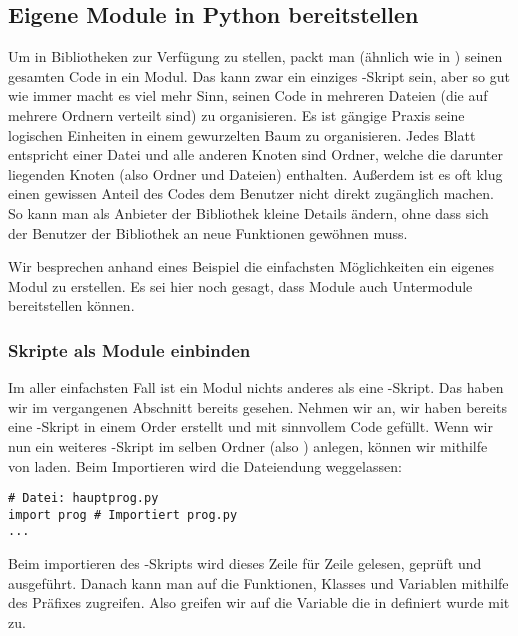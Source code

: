 \subsection{Eigene Module in Python bereitstellen}
\label{section:module:module_selbst_schreiben}
Um in \Python Bibliotheken zur Verfügung zu stellen, packt man (ähnlich wie in \CC) seinen gesamten Code in ein Modul.
Das kann zwar ein einziges \Python-Skript sein, aber so gut wie immer macht es viel mehr Sinn, seinen Code in mehreren Dateien (die auf mehrere Ordnern verteilt sind) zu organisieren.
Es ist gängige Praxis seine logischen Einheiten in einem gewurzelten Baum zu organisieren.
Jedes Blatt entspricht einer Datei und alle anderen Knoten sind Ordner, welche die darunter liegenden Knoten (also Ordner und Dateien) enthalten.
Außerdem ist es oft klug einen gewissen Anteil des Codes dem Benutzer nicht direkt zugänglich machen.
So kann man als Anbieter der Bibliothek kleine Details ändern, ohne dass sich der Benutzer der Bibliothek an neue Funktionen gewöhnen muss.

Wir besprechen anhand eines Beispiel die einfachsten Möglichkeiten ein eigenes Modul zu erstellen.
Es sei hier noch gesagt, dass Module auch Untermodule bereitstellen können.


\subsubsection{Skripte als Module einbinden}
Im aller einfachsten Fall ist ein Modul nichts anderes als eine \Python-Skript.
Das haben wir im vergangenen Abschnitt bereits gesehen.
Nehmen wir an, wir haben bereits eine \Python-Skript  in einem Order  erstellt und mit sinnvollem Code gefüllt.
Wenn wir nun ein weiteres \Python-Skript  im selben Ordner (also ) anlegen, können wir  mithilfe von  laden.
Beim Importieren wird die Dateiendung weggelassen:
\begin{lstlisting}
# Datei: hauptprog.py
import prog # Importiert prog.py
...
\end{lstlisting}
Beim importieren des \Python-Skripts  wird dieses Zeile für Zeile gelesen, geprüft und ausgeführt.
Danach kann man auf die Funktionen, Klasses und Variablen mithilfe des Präfixes  zugreifen.
Also greifen wir auf die Variable  die in  definiert wurde mit  zu.

